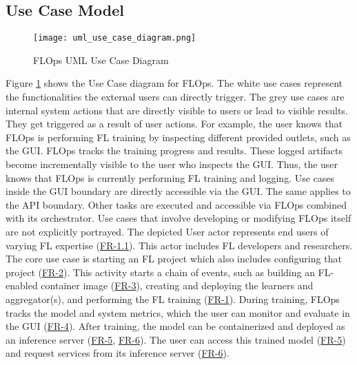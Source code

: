 \subsection{Use Case Model}

\begin{figure}[p]
    \begin{adjustwidth}{-0.1\paperwidth}{-0.1\paperwidth}
        \centering
        \texttt{[image: uml\_use\_case\_diagram.png]}
        \caption{FLOps UML Use Case Diagram}
        \label{fig:uml_use_case_diagram}
    \end{adjustwidth}
\end{figure}

Figure \ref{fig:uml_use_case_diagram} shows the Use Case diagram for FLOps.
The white use cases represent the functionalities the external users can directly trigger.
The grey use cases are internal system actions that are directly visible to users or lead to visible results.
They get triggered as a result of user actions.
For example, the user knows that FLOps is performing FL training by inspecting different provided outlets, such as the GUI.
FLOps tracks the training progress and results.
These logged artifacts become incrementally visible to the user who inspects the GUI.
Thus, the user knows that FLOps is currently performing FL training and logging.
Use cases inside the GUI boundary are directly accessible via the GUI. 
The same applies to the API boundary.
Other tasks are executed and accessible via FLOps combined with its orchestrator.
Use cases that involve developing or modifying FLOps itself are not explicitly portrayed.
The depicted User actor represents end users of varying FL expertise (\hyperref[FR-1.1]{FR-1.1}).
This actor includes FL developers and researchers.
The core use case is starting an FL project which also includes configuring that project (\hyperref[FR-2]{FR-2}).
This activity starts a chain of events, such as building an FL-enabled container image (\hyperref[FR-3]{FR-3}), creating and deploying the learners and aggregator(s), and performing the FL training (\hyperref[FR-1]{FR-1}).
During training, FLOps tracks the model and system metrics, which the user can monitor and evaluate in the GUI (\hyperref[FR-4]{FR-4}).
After training, the model can be containerized and deployed as an inference server (\hyperref[FR-5]{FR-5}, \hyperref[FR-6]{FR-6}).
The user can access this trained model (\hyperref[FR-5]{FR-5}) and request services from its inference server (\hyperref[FR-6]{FR-6}).
